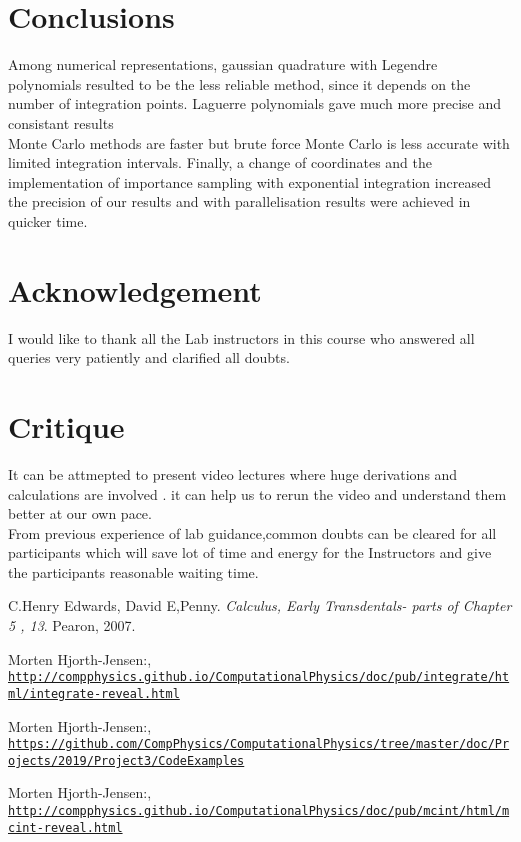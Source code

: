 \documentclass[9pt,a4paper,titlepage]{article}
\begin{document}
\section{Conclusions}
Among numerical representations, gaussian quadrature with Legendre polynomials resulted to be the less reliable method, since it depends  on the number of integration points. 
Laguerre polynomials gave much more precise  and consistant results 
\\ Monte Carlo methods are faster but brute force Monte Carlo is less accurate with limited integration intervals. 
Finally, a change of coordinates and the implementation of importance sampling with exponential integration increased the precision of our results and with parallelisation results were achieved in quicker time.

\section{Acknowledgement}
I would like to thank all the Lab instructors in this course who answered all queries very patiently and clarified all doubts.

\section{Critique}
It can be attmepted to present video lectures where huge  derivations and calculations are involved . it can help us to rerun the video and understand them better at our own pace.
\\ From previous experience of lab guidance,common doubts can be cleared for all participants which will save lot of time and energy for the Instructors and give the participants reasonable waiting time.
\medskip
 
\begin{thebibliography}{9}
C.Henry Edwards, David E,Penny. 
\textit{Calculus, Early Transdentals- parts of Chapter 5 , 13}. 
Pearon, 2007.

Morten Hjorth-Jensen:,
\\\texttt{\url{http://compphysics.github.io/ComputationalPhysics/doc/pub/integrate/html/integrate-reveal.html}}

Morten Hjorth-Jensen:,
\\\texttt{\url{https://github.com/CompPhysics/ComputationalPhysics/tree/master/doc/Projects/2019/Project3/CodeExamples}}

Morten Hjorth-Jensen:,
\\\texttt{\url{http://compphysics.github.io/ComputationalPhysics/doc/pub/mcint/html/mcint-reveal.html}}


\end{thebibliography}
\end{document}
